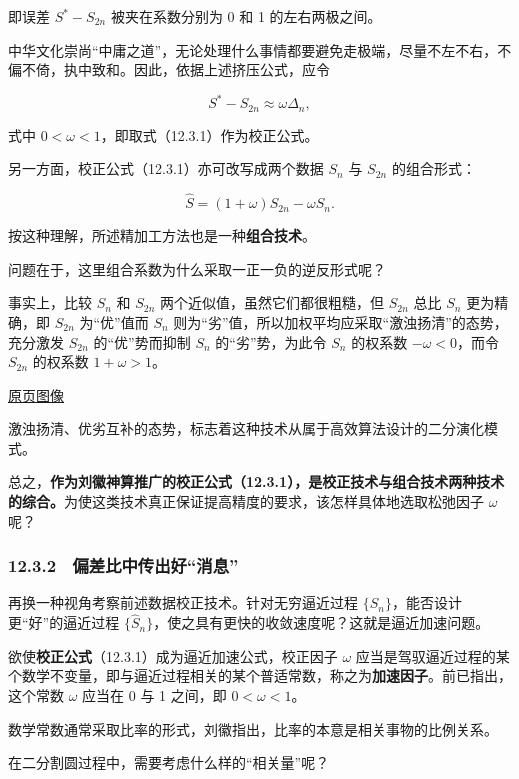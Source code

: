 \documentclass[
  10pt,
  fontset=fandol]{ctexart}
\begin{document}
即误差 \(S^*-S_{2n}\) 被夹在系数分别为 0 和 1 的左右两极之间。

中华文化崇尚``中庸之道''，无论处理什么事情都要避免走极端，尽量不左不右，不偏不倚，执中致和。因此，依据上述挤压公式，应令

\[
S^*-S_{2n}\approx\omega\Delta_n,
\]

式中 \(0<\omega<1\)，即取式（12.3.1）作为校正公式。

另一方面，校正公式（12.3.1）亦可改写成两个数据 \(S_n\) 与 \(S_{2n}\) 的组合形式：

\[
\widehat S=(1+\omega)S_{2n}-\omega S_n.
\]

按这种理解，所述精加工方法也是一种\textbf{组合技术}。

问题在于，这里组合系数为什么采取一正一负的逆反形式呢？

事实上，比较 \(S_n\) 和 \(S_{2n}\) 两个近似值，虽然它们都很粗糙，但 \(S_{2n}\) 总比 \(S_n\) 更为精确，即 \(S_{2n}\) 为``优''值而 \(S_n\) 则为``劣''值，所以加权平均应采取``激浊扬清''的态势，充分激发 \(S_{2n}\) 的``优''势而抑制 \(S_n\) 的``劣''势，为此令 \(S_n\) 的权系数 \(-\omega<0\)，而令 \(S_{2n}\) 的权系数 \(1+\omega>1\)。

\href{../../source-images/pdf-299.jpeg}{原页图像}

激浊扬清、优劣互补的态势，标志着这种技术从属于高效算法设计的二分演化模式。

总之，\textbf{作为刘徽神算推广的校正公式（12.3.1），是校正技术与组合技术两种技术的综合。}为使这类技术真正保证提高精度的要求，该怎样具体地选取松弛因子 \(\omega\) 呢？

\subsubsection{12.3.2　偏差比中传出好``消息''}\label{ux504fux5deeux6bd4ux4e2dux4f20ux51faux597dux6d88ux606f}

再换一种视角考察前述数据校正技术。针对无穷逼近过程 \(\{S_n\}\)，能否设计更``好''的逼近过程 \(\{\widehat S_n\}\)，使之具有更快的收敛速度呢？这就是逼近加速问题。

欲使\textbf{校正公式}（12.3.1）成为逼近加速公式，校正因子 \(\omega\) 应当是驾驭逼近过程的某个数学不变量，即与逼近过程相关的某个普适常数，称之为\textbf{加速因子}。前已指出，这个常数 \(\omega\) 应当在 0 与 1 之间，即 \(0<\omega<1\)。

数学常数通常采取比率的形式，刘徽指出，比率的本意是相关事物的比例关系。

在二分割圆过程中，需要考虑什么样的``相关量''呢？
\end{document}
